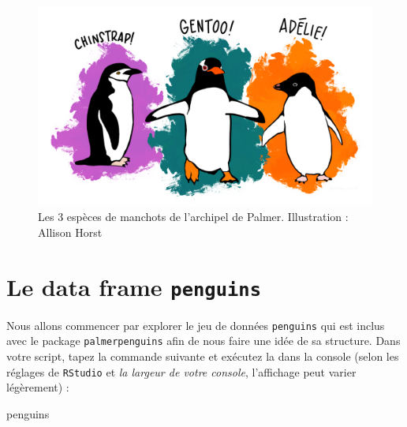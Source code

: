 \documentclass[
  letterpaper,
  DIV=11,
  numbers=noendperiod]{scrreprt}
\newenvironment{Shaded}{\begin{snugshade}}{\end{snugshade}}
\newcommand{\NormalTok}[1]{\textcolor[rgb]{0.00,0.23,0.31}{#1}}
\begin{document}
\begin{figure}

{\centering \includegraphics{./images/Penguins.png}

}

\caption{Les 3 espèces de manchots de l'archipel de Palmer. Illustration
: Allison Horst}

\end{figure}

\hypertarget{le-data-frame-penguins}{%
\section{\texorpdfstring{Le data frame
\texttt{penguins}}{Le data frame penguins}}\label{le-data-frame-penguins}}

Nous allons commencer par explorer le jeu de données \texttt{penguins}
qui est inclus avec le package \texttt{palmerpenguins} afin de nous
faire une idée de sa structure. Dans votre script, tapez la commande
suivante et exécutez la dans la console (selon les réglages de
\texttt{RStudio} et \emph{la largeur de votre console}, l'affichage peut
varier légèrement) :

\begin{Shaded}
\begin{Highlighting}[]
\NormalTok{penguins}
\end{Highlighting}
\end{Shaded}
\end{document}
